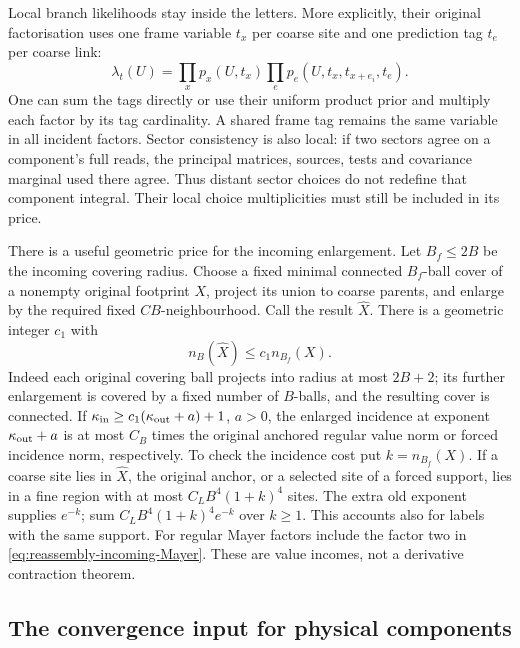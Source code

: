\documentclass[11pt,reqno]{amsart}
\numberwithin{equation}{section}
\theoremstyle{definition}
\theoremstyle{remark}
\begin{document}
Local branch likelihoods stay inside the letters. More explicitly,
their original factorisation uses one frame variable \(t_x\) per
coarse site and one prediction tag \(t_e\) per coarse link:
\[
       \lambda_t(U)=\prod_x p_x(U,t_x)
                         \prod_e p_e(U,t_x,t_{x+e_i},t_e).
\]
One can sum the tags directly or use their uniform product prior
and multiply each factor by its tag cardinality. A shared frame
tag remains the same variable in all incident factors.
Sector consistency is also local: if two sectors agree on a
component's full reads, the principal matrices, sources, tests
and covariance marginal used there agree. Thus distant sector
choices do not redefine that component integral. Their local
choice multiplicities must still be included in its price.

There is a useful geometric price for the incoming enlargement.
Let \(B_f\le2B\) be the incoming covering radius. Choose a fixed
minimal connected \(B_f\)-ball cover of a nonempty original
footprint \(X\), project its union to coarse parents, and enlarge
by the required fixed \(CB\)-neighbourhood. Call the result
\(\widehat X\). There is a geometric integer \(c_1\) with
\begin{equation}
                         n_B(\widehat X)\le c_1n_{B_f}(X).
 \label{eq:reassembly-cover-enlargement}
\end{equation}
Indeed each original covering ball projects into radius at most
\(2B+2\); its further enlargement is covered by a fixed number
of \(B\)-balls, and the resulting cover is connected.
If \(\kappa_{\rm in}\ge c_1(\kappa_{\rm out}+a)+1\),
\(a>0\), the enlarged incidence at exponent
\(\kappa_{\rm out}+a\) is at most \(C_B\) times the original
anchored regular value norm or forced incidence norm, respectively.
To check the incidence cost put \(k=n_{B_f}(X)\). If a coarse
site lies in \(\widehat X\), the original anchor, or a selected
site of a forced support, lies in a fine region with at most
\(C_LB^4(1+k)^4\) sites. The extra old exponent supplies
\(e^{-k}\); sum \(C_LB^4(1+k)^4e^{-k}\) over \(k\ge1\).
This accounts also for labels with the same support.
For regular Mayer factors include the factor two in
\eqref{eq:reassembly-incoming-Mayer}. These are value incomes,
not a derivative contraction theorem.

\subsection{The convergence input for physical components}
\end{document}
